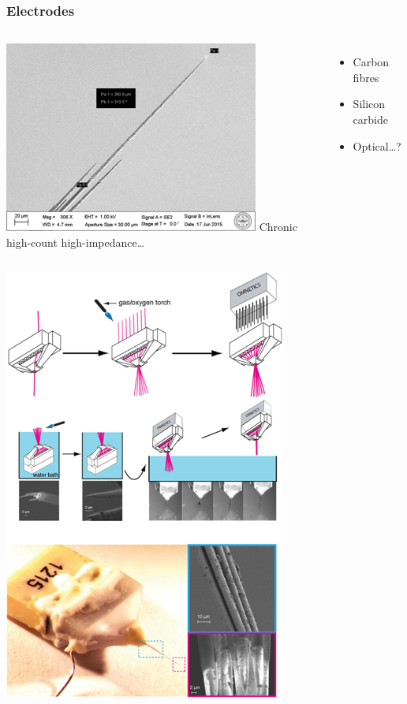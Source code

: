 \documentclass{beamer}
\begin{document}
\begin{frame}
  \frametitle{Electrodes}
  \begin{columns}
    \column{6cm}
    \includegraphics[width=\textwidth]{electrodes_up_close}
    \column{4cm}
    Chronic high-count high-impedance\dots
    \begin{itemize}
    \item Carbon fibres
    \item Silicon carbide
    \item Optical\dots?
    \end{itemize}
  \end{columns}
\end{frame}

\begin{frame}[plain]
  \begin{center}
    \includegraphics[height=\textheight]{julia_electrodes}
  \end{center}
\end{frame}
\end{document}
